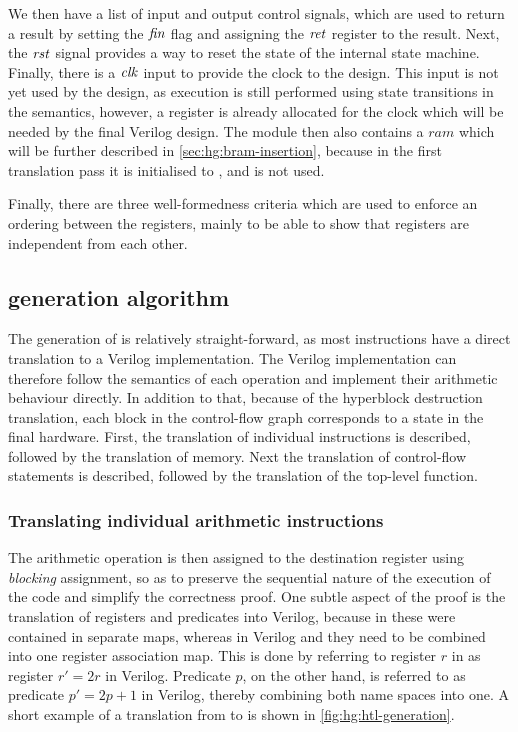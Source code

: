 We then have a list of input and output control signals, which are used to
return a result by setting the $\mathit{fin}$ flag and assigning the
$\mathit{ret}$ register to the result.  Next, the $\mathit{rst}$ signal
provides a way to reset the state of the internal state machine.  Finally, there
is a $\mathit{clk}$ input to provide the clock to the design.  This input is not
yet used by the \htl{} design, as execution is still performed using state
transitions in the semantics, however, a register is already allocated for the
clock which will be needed by the final Verilog design.  The module then also
contains a $\mathit{ram}$ which will be further described in
\cref{sec:hg:bram-insertion}, because in the first translation pass it is
initialised to \cnone, and is not used.

Finally, there are three well-formedness criteria which are used to enforce an
ordering between the registers, mainly to be able to show that registers are
independent from each other.

\subsection{\htl{} generation algorithm}%
\label{sec:hg:htl-generation-algorithm}

The generation of \htl{} is relatively straight-forward, as most instructions
have a direct translation to a Verilog implementation.  The Verilog
implementation can therefore follow the semantics of each operation and
implement their arithmetic behaviour directly.  In addition to that, because of
the hyperblock destruction translation, each block in the control-flow graph
corresponds to a state in the final hardware.  First, the translation of
individual instructions is described, followed by the translation of memory.
Next the translation of control-flow statements is described, followed by the
translation of the top-level function.

\subsubsection{Translating individual arithmetic instructions}%
\label{sec:hg:translating-individual-arithmetic-instructions}

The arithmetic operation is then assigned to the destination register using
\emph{blocking} assignment, so as to preserve the sequential nature of the
execution of the code and simplify the correctness proof.  One subtle aspect of
the proof is the translation of registers and predicates into Verilog, because
in \rtlsubpar{} these were contained in separate maps, whereas in Verilog and
\htl{} they need to be combined into one register association map.  This is done
by referring to register $r$ in \rtlsubpar{} as register $r' = 2r$ in Verilog.
Predicate $p$, on the other hand, is referred to as predicate $p' = 2p + 1$ in
Verilog, thereby combining both name spaces into one.  A short example of a
translation from \rtlsubpar{} to \htl{} is shown in
\cref{fig:hg:htl-generation}.

